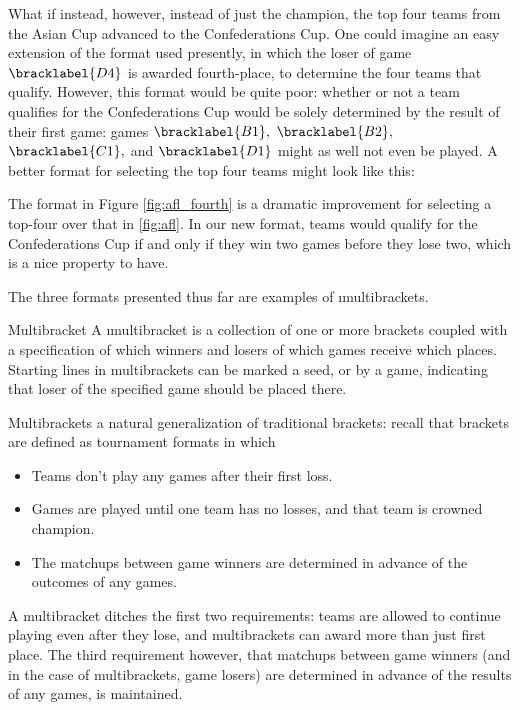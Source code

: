 {    What if instead, however, instead of just the champion, the top four teams from the Asian Cup advanced to the Confederations Cup. One could imagine an easy extension of the format used presently, in which the loser of game $\bracklabel{D4}$ is awarded fourth-place, to determine the four teams that qualify. However, this format would be quite poor: whether or not a team qualifies for the Confederations Cup would be solely determined by the result of their first game: games $\bracklabel{B1},$ $\bracklabel{B2},$ $\bracklabel{C1},$ and $\bracklabel{D1}$ might as well not even be played. A better format for selecting the top four teams might look like this:


    The format in Figure \ref{fig:afl_fourth} is a dramatic improvement for selecting a top-four over that in \ref{fig:afl}. In our new format, teams would qualify for the Confederations Cup if and only if they win two games before they lose two, which is a nice property to have.

    The three formats presented thus far are examples of \i{multibrackets}.

    \begin{definition}{Multibracket}{}
        A \i{multibracket} is a collection of one or more brackets coupled with a specification of which winners and losers of which games receive which places. Starting lines in multibrackets can be marked a seed, or by a game, indicating that loser of the specified game should be placed there.
    \end{definition}

    Multibrackets a natural generalization of traditional brackets: recall that brackets are defined as tournament formats in which
    \begin{itemize}
        \item Teams don't play any games after their first loss.
        \item Games are played until one team has no losses, and that team is crowned champion.
        \item The matchups between game winners are determined in advance of the outcomes of any games.
    \end{itemize}

    A multibracket ditches the first two requirements: teams are allowed to continue playing even after they lose, and multibrackets can award more than just first place. The third requirement however, that matchups between game winners (and in the case of multibrackets, game losers) are determined in advance of the results of any games, is maintained.

}
